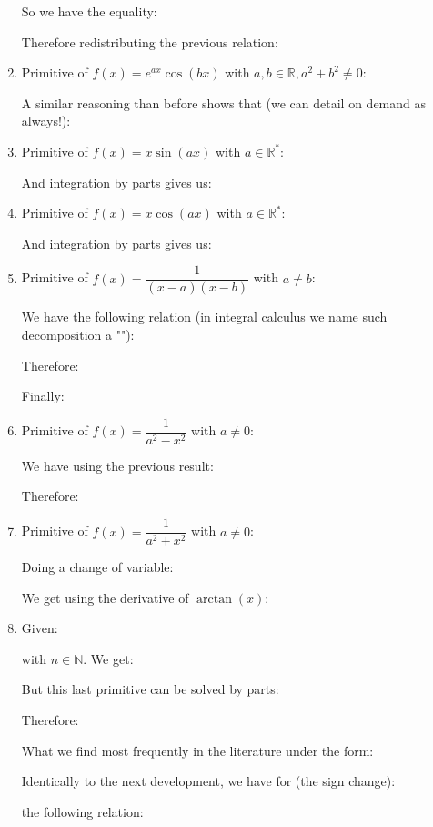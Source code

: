 \begin{enumerate}
		So we have the equality:
		
		Therefore redistributing the previous relation:
		
		
		\item Primitive of $f(x)=e^{ax}\cos(bx)$ with $a,b\in \mathbb{R},a^2+b^2\neq 0$:
		
		A similar reasoning than before shows that (we can detail on demand as always!):
		
		
		\item Primitive of $f(x)=x\sin(ax)$ with $a \in \mathbb{R}^*$:
		
		And integration by parts gives us:
		
		
		\item Primitive of $f(x)=x\cos(ax)$ with $a \in \mathbb{R}^*$:
		
		And integration by parts gives us:
		
		
		\item Primitive of $f(x)=\dfrac{1}{(x-a)(x-b)}$ with $a \neq b$:
		
		We have the following relation (in integral calculus we name such decomposition a ""):
		
		Therefore:
		
		
		Finally:
		
		
		\item Primitive of $f(x)=\dfrac{1}{a^2-x^2}$ with $a \neq 0$:
		
		We have using the previous result:	
		
		Therefore:
		

		\item Primitive of $f(x)=\dfrac{1}{a^2+x^2}$ with $a \neq 0$:
		
		Doing a change of variable:
		
		We get using the derivative of $\arctan (x)$:
		
		
		\item Given:
		
		with $n \in \mathbb{N}$. We get:
		
		But this last primitive can be solved by parts:
		
		Therefore:
		
		What we find most frequently in the literature under the form:
		
		Identically to the next development, we have for (the sign change):
		
		the following relation:
		

\end{enumerate}
